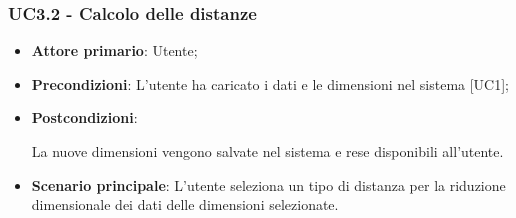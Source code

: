 \subsubsection{UC3.2 - Calcolo delle distanze}
\begin{itemize}
	\item \textbf{Attore primario}: Utente;
	\item \textbf{Precondizioni}: L'utente ha caricato i dati e le dimensioni nel sistema [UC1];
	\item \textbf{Postcondizioni}: 


La nuove dimensioni vengono salvate nel sistema e rese disponibili all'utente.

	\item \textbf{Scenario principale}: L'utente seleziona un tipo di distanza per la riduzione dimensionale dei dati delle dimensioni selezionate.
\end{itemize}